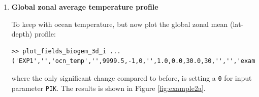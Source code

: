 \documentclass[11pt,fleqn]{book} %
\begin{document}
\begin{enumerate}[noitemsep]
\begin{figure}[ht]
\begin{center}
\texttt{[image: example1b.171031.ps]}
\end{center}
\vspace{-11mm}
\caption{Example surface temperature plot, with contours.}
\label{fig:example1b}
\end{figure}

To add contours, in the \footnotesize\textsf{SETTINGS }\normalsize parameter file, adjust the following line:
\small
\vspace{-2pt}\begin{verbatim}
contour_plot = 'y';     % [ 'y']  OVERLAY CONTOUR PLOT?
\end{verbatim}\vspace{-2pt}
\normalsize
The results of this are shown in Figure \ref{fig:example1b}. Refinements to the contouring can be done by changing the lines:
\small
\vspace{-2pt}\begin{verbatim}
contour_mod = 1;        % [   1]  NUMBER OF COLOR INTERVALS PER CONTOR
contour_mod_label = 5;  % [   5]  NUMBER OF LABELED CONTOURS PER CONTOUR
contour_label = 'y';    % [ 'y']  LABEL CONTOURS?
contour_dashneg = 'n';  % [ 'n']  PLOT NEGATIVE CONTOURS DASHED?
\end{verbatim}\vspace{-2pt}
\normalsize
(these are the more commonly used refinements).

Alternatively, using 3d plotting:

\footnotesize
\vspace{-0pt}\begin{verbatim}
>> plot_fields_biogem_3d_k ...
('EXP1','','ocn_temp','',9999.5,-1,16,'',1.0,0.0,30.0,30,'','','example1c');
\end{verbatim}\vspace{-0pt}
\normalsize
The only thing that changes here is the variable name -- now \texttt{ocn\_temp}, and the plot is identical to Figure \ref{fig:example1a}.

\vspace{4pt}
\item \textbf{Global zonal average temperature profile}

To keep with ocean temperature, but now plot the global zonal mean (lat-depth) profile:

\footnotesize
\vspace{-0pt}\begin{verbatim}
>> plot_fields_biogem_3d_i ...
('EXP1','','ocn_temp','',9999.5,-1,0,'',1.0,0.0,30.0,30,'','','example2a');
\end{verbatim}\vspace{-0pt}
\normalsize
where the only significant change compared to before, is setting a \texttt{0} for input parameter \texttt{PIK}. The results is shown in Figure \ref{fig:example2a}.


\end{enumerate}
\end{document}

